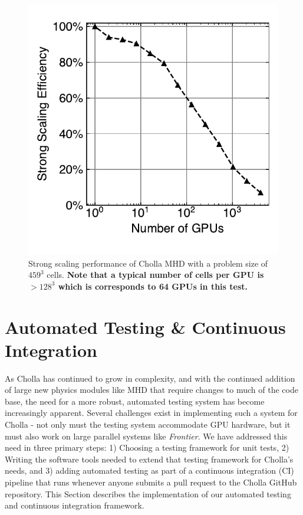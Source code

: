 \documentclass[modern]{aastex631}
\newcommand*{\img}[1]{%
    \raisebox{-.05\baselineskip}{%
        \texttt{[image: \#1]}%
    }%
}
\begin{document}
\begin{figure}[ht!]
    \centering
    \includegraphics{scaling_test_strong_efficiency.pdf}
    \caption{Strong scaling performance of Cholla MHD with a problem size of $459^3$ cells. \textbf{Note that a typical number of cells per GPU is $>128^3$ which is corresponds to 64 GPUs in this test.} \href{https://zenodo.org/records/10927223}{\img{zenodo-gradient-200.png}}}
    \label{fig:scaling-strong}
\end{figure}

\section{Automated Testing \& Continuous Integration}
\label{sec:testing}

As Cholla has continued to grow in complexity, and with the continued addition of large new physics modules like MHD that require changes to much of the code base, the need for a more robust, automated testing system has become increasingly apparent. Several challenges exist in implementing such a system for Cholla - not only must the testing system accommodate GPU hardware, but it must also work on large parallel systems like \textit{Frontier}. We have addressed this need in three primary steps: 1) Choosing a testing framework for unit tests, 2) Writing the software tools needed to extend that testing framework for Cholla's needs, and 3) adding automated testing as part of a continuous integration (CI) pipeline that runs whenever anyone submits a pull request to the Cholla GitHub repository. This Section describes the implementation of our automated testing and continuous integration framework.
\end{document}
